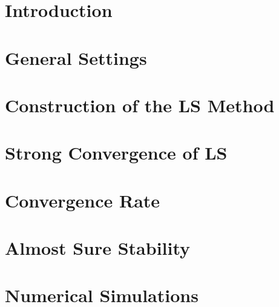 \label{paper:paperB}
	\section{Introduction}
		
	\section{General Settings}
		
		
	\section{Construction of the LS Method}
		
	\section{Strong Convergence of LS}
		
	\section{Convergence Rate}
		
	\section{Almost Sure Stability}
		
	\section{Numerical Simulations}
		